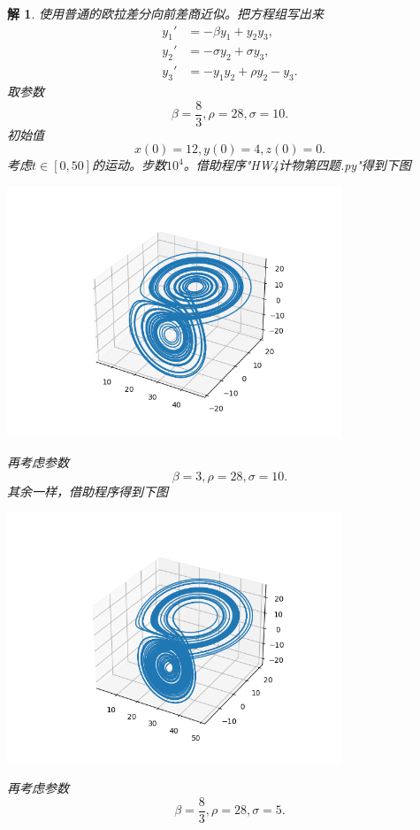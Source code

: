 \documentclass[10pt]{ctexart}
\newtheorem*{solution}{解}
\begin{document}
\begin{solution}
    使用普通的欧拉差分向前差商近似。把方程组写出来
    $$\begin{align}
        y_1'&=-\beta y_1+y_2 y_3,\\
        y_2'&=-\sigma y_2+\sigma y_3,\\
        y_3'&=-y_1y_2+\rho y_2-y_3.
    \end{align}$$
    取参数
    $$\beta=\frac{8}{3},\rho=28,\sigma=10.$$
    初始值
    $$x(0)=12,y(0)=4,z(0)=0.$$
    考虑$t\in [0,50]$的运动。步数$10^4$。借助程序"HW4计物第四题.py"得到下图
    \begin{table}[H]
        \centering
        \includegraphics[width=10cm]{1.png}
        \caption{$\beta=\frac{8}{3},\rho=28,\sigma=10$}
    \end{table}
    再考虑参数
    $$\beta=3,\rho=28,\sigma=10.$$
    其余一样，借助程序得到下图
    \begin{table}[H]
        \centering
        \includegraphics[width=10cm]{2.png}
        \caption{$\beta=3,\rho=28,\sigma=10$}
    \end{table}
    再考虑参数
    $$\beta=\frac{8}{3},\rho=28,\sigma=5.$$

\end{solution}
\end{document}
